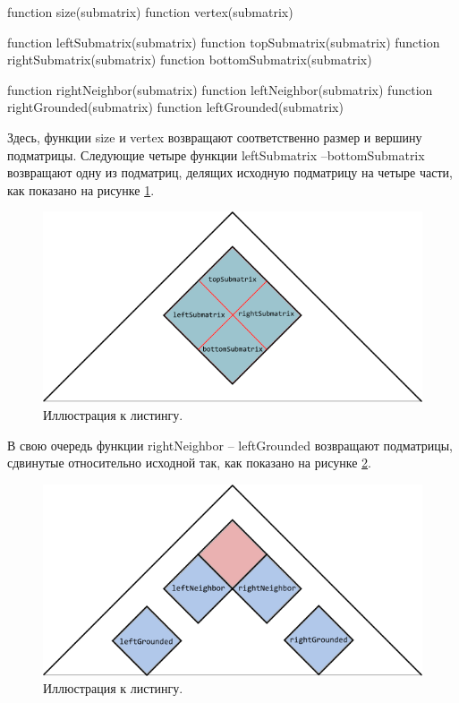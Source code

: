 \documentclass[12pt]{article}  %
\theoremstyle{definition}
\theoremstyle{remark}
\begin{document}
\begin{algorithm}[caption={Submatrix helpers.}, label={helpers}]
function size(submatrix)
function vertex(submatrix)

function leftSubmatrix(submatrix)
function topSubmatrix(submatrix)
function rightSubmatrix(submatrix)
function bottomSubmatrix(submatrix)

function rightNeighbor(submatrix)
function leftNeighbor(submatrix)
function rightGrounded(submatrix)
function leftGrounded(submatrix)     
\end{algorithm}

Здесь, функции size и vertex возвращают соответственно размер и вершину подматрицы. Следующие четыре функции leftSubmatrix --\linebreak bottomSubmatrix возвращают одну из подматриц, делящих исходную подматрицу на четыре части, как показано на рисунке \ref{gr:inner}.


\begin{figure}[!ht]
  \caption{Иллюстрация к листингу.}
  \label{gr:inner}
  \centering
    \includegraphics[width=0.9\linewidth]{inner.png}
\end{figure}

\pagebreak

В свою очередь функции rightNeighbor -- leftGrounded возвращают подматрицы, сдвинутые относительно исходной так, как показано на рисунке \ref{gr:outer}.

\begin{figure}[!ht]
  \caption{Иллюстрация к листингу.}
  \label{gr:outer}
  \centering
    \includegraphics[width=0.9\linewidth]{outer.png}
\end{figure}
\end{document}
